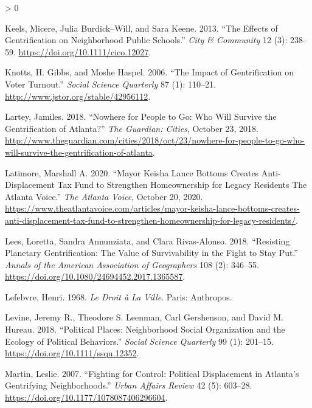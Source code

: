 \documentclass[
  12pt,
]{article}
\newlength{\cslhangindent}
\newenvironment{CSLReferences}[2] %
 {%
  \setlength{\parindent}{0pt}
  \ifodd #1 \everypar{\setlength{\hangindent}{\cslhangindent}}\ignorespaces\fi
  \ifnum #2 > 0
  \setlength{\parskip}{#2\baselineskip}
  \fi
 }%
 {}
\begin{document}
\begin{CSLReferences}{1}{0}
\leavevmode\hypertarget{ref-Keels2013}{}%
Keels, Micere, Julia Burdick--Will, and Sara Keene. 2013. {``The {Effects} of {Gentrification} on {Neighborhood Public Schools}.''} \emph{City \& Community} 12 (3): 238--59. \url{https://doi.org/10.1111/cico.12027}.

\leavevmode\hypertarget{ref-Knotts2006}{}%
Knotts, H. Gibbs, and Moshe Haspel. 2006. {``The {Impact} of {Gentrification} on {Voter Turnout}.''} \emph{Social Science Quarterly} 87 (1): 110--21. \url{http://www.jstor.org/stable/42956112}.

\leavevmode\hypertarget{ref-Lartey2018}{}%
Lartey, Jamiles. 2018. {``Nowhere for People to Go: Who Will Survive the Gentrification of {Atlanta}?''} \emph{The Guardian: Cities}, October 23, 2018. \url{http://www.theguardian.com/cities/2018/oct/23/nowhere-for-people-to-go-who-will-survive-the-gentrification-of-atlanta}.

\leavevmode\hypertarget{ref-Latimore2020}{}%
Latimore, Marshall A. 2020. {``Mayor {Keisha Lance Bottoms} Creates Anti-Displacement Tax Fund to Strengthen Homeownership for Legacy Residents \textbar{} {The Atlanta Voice}.''} \emph{The Atlanta Voice}, October 20, 2020. \url{https://www.theatlantavoice.com/articles/mayor-keisha-lance-bottoms-creates-anti-displacement-tax-fund-to-strengthen-homeownership-for-legacy-residents/}.

\leavevmode\hypertarget{ref-Lees2018}{}%
Lees, Loretta, Sandra Annunziata, and Clara Rivas-Alonso. 2018. {``Resisting {Planetary Gentrification}: {The Value} of {Survivability} in the {Fight} to {Stay Put}.''} \emph{Annals of the American Association of Geographers} 108 (2): 346--55. \url{https://doi.org/10.1080/24694452.2017.1365587}.

\leavevmode\hypertarget{ref-Lefebvre1968}{}%
Lefebvre, Henri. 1968. \emph{Le {Droit} à La {Ville}}. {Paris}: {Anthropos}.

\leavevmode\hypertarget{ref-Levine2018}{}%
Levine, Jeremy R., Theodore S. Leenman, Carl Gershenson, and David M. Hureau. 2018. {``Political {Places}: {Neighborhood Social Organization} and the {Ecology} of {Political Behaviors}.''} \emph{Social Science Quarterly} 99 (1): 201--15. \url{https://doi.org/10.1111/ssqu.12352}.

\leavevmode\hypertarget{ref-Martin2007a}{}%
Martin, Leslie. 2007. {``Fighting for {Control}: {Political Displacement} in {Atlanta}'s {Gentrifying Neighborhoods}.''} \emph{Urban Affairs Review} 42 (5): 603--28. \url{https://doi.org/10.1177/1078087406296604}.


\end{CSLReferences}
\end{document}
